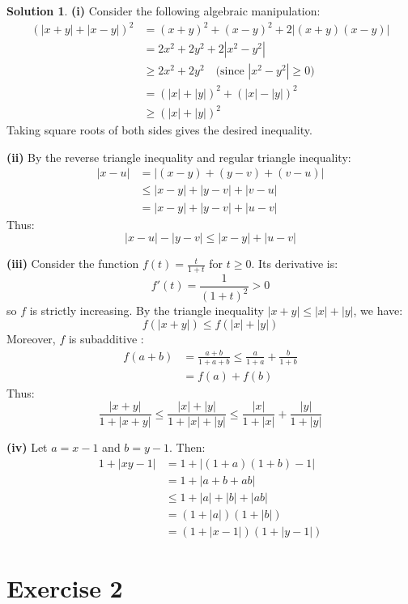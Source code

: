 \documentclass{article}
\theoremstyle{definition}
\newtheorem*{solution}{Solution}
\begin{document}
\begin{solution}
\textbf{(i)} Consider the following algebraic manipulation:
\begin{align*}
(|x + y| + |x - y|)^2 &= (x + y)^2 + (x - y)^2 + 2|(x + y)(x - y)| \\
&= 2x^2 + 2y^2 + 2|x^2 - y^2| \\
&\geq 2x^2 + 2y^2 \quad \text{(since } |x^2 - y^2| \geq 0) \\
&= (|x| + |y|)^2 + (|x| - |y|)^2 \\
&\geq (|x| + |y|)^2
\end{align*}
Taking square roots of both sides gives the desired inequality.

\textbf{(ii)} By the reverse triangle inequality and regular triangle inequality:
\begin{align*}
|x - u| &= |(x - y) + (y - v) + (v - u)| \\
&\leq |x - y| + |y - v| + |v - u| \\
&= |x - y| + |y - v| + |u - v|
\end{align*}
Thus:
\[ |x - u| - |y - v| \leq |x - y| + |u - v| \]

\textbf{(iii)} Consider the function \( f(t) = \frac{t}{1 + t} \) for \( t \geq 0 \). Its derivative is:
\[ f'(t) = \frac{1}{(1 + t)^2} > 0 \]
so \( f \) is strictly increasing. By the triangle inequality \( |x + y| \leq |x| + |y| \), we have:
\[ f(|x + y|) \leq f(|x| + |y|) \]
Moreover, \( f \) is subadditive :
\begin{align*}
f(a + b) &= \frac{a + b}{1 + a + b} \leq \frac{a}{1 + a} + \frac{b}{1 + b} \\
&= f(a) + f(b)
\end{align*}
Thus:
\[ \frac{|x + y|}{1 + |x + y|} \leq \frac{|x| + |y|}{1 + |x| + |y|} \leq \frac{|x|}{1 + |x|} + \frac{|y|}{1 + |y|} \]

\textbf{(iv)} Let \( a = x - 1 \) and \( b = y - 1 \). Then:
\begin{align*}
1 + |xy - 1| &= 1 + |(1 + a)(1 + b) - 1| \\
&= 1 + |a + b + ab| \\
&\leq 1 + |a| + |b| + |ab| \\
&= (1 + |a|)(1 + |b|) \\
&= (1 + |x - 1|)(1 + |y - 1|)
\end{align*}
\end{solution}

\section*{Exercise 2}
\end{document}
